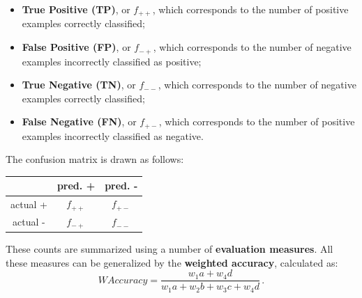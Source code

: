\begin{itemize}
    \item \textbf{True Positive (TP)}, or $f_{++}$, which corresponds to the number of positive examples correctly classified;

    \item \textbf{False Positive (FP)}, or $f_{-+}$, which corresponds to the number of negative examples incorrectly classified as positive;

    \item \textbf{True Negative (TN)}, or $f_{--}$, which corresponds to the number of negative examples correctly classified;

    \item \textbf{False Negative (FN)}, or $f_{+-}$, which corresponds to the number of positive examples incorrectly classified as negative.
\end{itemize}

The confusion matrix is drawn as follows:

\begin{table}[h]
    \centering
    \begin{tabular}{|c|c|c|}
         \hline
         & pred. + & pred. - \\
        \hline
        actual + & $f_{++}$ & $f_{+-}$\\
        \hline
        actual - & $f_{-+}$ & $f_{--}$\\
        \hline
    \end{tabular}
\end{table}

These counts are summarized using a number of \textbf{evaluation measures}.
All these measures can be generalized by the \textbf{weighted accuracy}, calculated as:
\begin{equation*}
    \textit{WAccuracy} = \dfrac{w_1a + w_4d}{w_1a + w_2b + w_3c + w_4d} \, .
\end{equation*}

